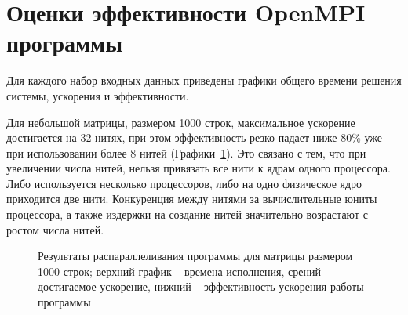 \documentclass[12pt, oneside, a4paper]{article}
\begin{document}
\section{Оценки эффективности OpenMPI программы}

Для каждого набор входных данных приведены графики общего времени решения системы, ускорения и эффективности.

Для небольшой матрицы, размером 1000 строк, максимальное ускорение достигается на 32 нитях, при этом эффективность резко падает ниже 80\% уже при использовании более 8 нитей (Графики~\ref{fig:m1000}). Это связано с тем, что при увеличении числа нитей, нельзя привязать все нити к ядрам одного процессора. Либо используется несколько процессоров, либо на одно физическое ядро приходится две нити. Конкуренция между нитями за вычислительные юниты процессора, а также издержки на создание нитей значительно возрастают с ростом числа нитей.

\begin{figure}[h!]
\caption{Результаты распараллеливания программы для матрицы размером 1000 строк; верхний график -- времена исполнения, срений -- достигаемое ускорение, нижний -- эффективность ускорения работы программы}
\label{fig:m1000}
\end{figure}
\end{document}
